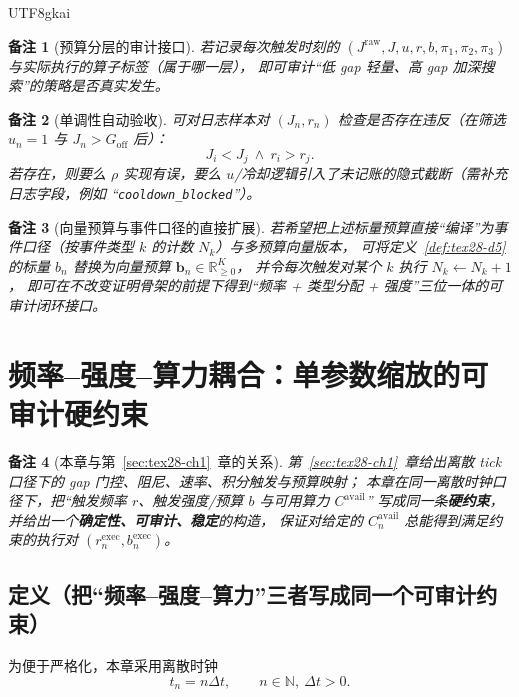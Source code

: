 \documentclass[12pt]{article}
\newtheorem{remark}{备注}[section]
\newcommand{\RR}{\mathbb{R}}
\newcommand{\NN}{\mathbb{N}}
\begin{document}
\begin{CJK*}{UTF8}{gkai}
\begin{remark}[预算分层的审计接口]
若记录每次触发时刻的
$(J^{\mathrm{raw}},J,u,r,b,\pi_1,\pi_2,\pi_3)$ 与实际执行的算子标签（属于哪一层），
即可审计“低 gap 轻量、高 gap 加深搜索”的策略是否真实发生。
\end{remark}

\begin{remark}[单调性自动验收]
可对日志样本对 $(J_n,r_n)$ 检查是否存在违反（在筛选 $u_n=1$ 与 $J_n>G_{\mathrm{off}}$ 后）：
\[
  J_i<J_j\ \wedge\ r_i>r_j.
\]
若存在，则要么 $\rho$ 实现有误，要么 $u$/冷却逻辑引入了未记账的隐式截断（需补充日志字段，例如 ``\texttt{cooldown\_blocked}''）。
\end{remark}

\begin{remark}[向量预算与事件口径的直接扩展]
若希望把上述标量预算直接“编译”为事件口径（按事件类型 $k$ 的计数 $N_k$）与多预算向量版本，
可将定义~\ref{def:tex28-d5} 的标量 $b_{n}$ 替换为向量预算 $\mathbf{b}_n\in\RR_{\ge 0}^{K}$，
并令每次触发对某个 $k$ 执行 $N_k\leftarrow N_k+1$，
即可在不改变证明骨架的前提下得到“频率 + 类型分配 + 强度”三位一体的可审计闭环接口。
\end{remark}

\clearpage

\section{频率--强度--算力耦合：单参数缩放的可审计硬约束}
\label{sec:tex28-ch2}

\begin{remark}[本章与第~\ref{sec:tex28-ch1}~章的关系]
第~\ref{sec:tex28-ch1}~章给出离散 tick 口径下的 gap 门控、阻尼、速率、积分触发与预算映射；
本章在同一离散时钟口径下，把“触发频率 $r$、触发强度/预算 $b$ 与可用算力 $C^{\mathrm{avail}}$”
写成同一条\textbf{硬约束}，并给出一个\textbf{确定性、可审计、稳定}的构造，
保证对给定的 $C^{\mathrm{avail}}_n$ 总能得到满足约束的执行对 $(r^{\mathrm{exec}}_n,b^{\mathrm{exec}}_n)$。
\end{remark}

\subsection{定义（把“频率--强度--算力”三者写成同一个可审计约束）}
\label{subsec:tex28-ch2-defs}
为便于严格化，本章采用离散时钟
\[
  t_n=n\Delta t,\qquad n\in\NN,\ \Delta t>0.
\]


\end{CJK*}
\end{document}
